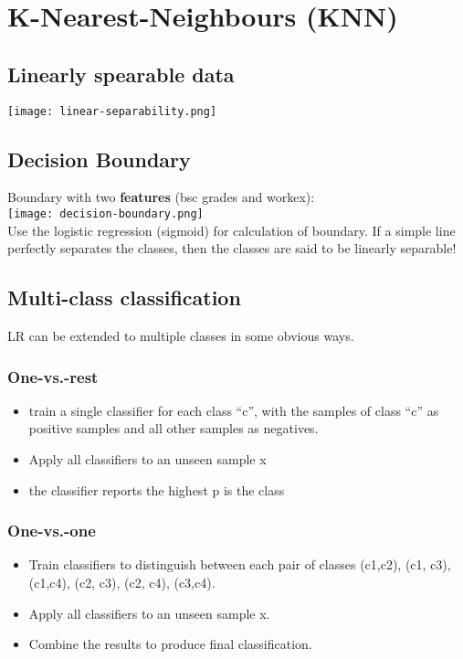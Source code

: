 \section{K-Nearest-Neighbours (KNN)}
\subsection{Linearly spearable data}
\texttt{[image: linear-separability.png]}

\subsection{Decision Boundary}
Boundary with two \textbf{features} (bsc grades and workex):\\
\texttt{[image: decision-boundary.png]}\\
Use the logistic regression (sigmoid) for calculation of boundary.
If a simple line perfectly separates the classes, then the classes are said to be linearly separable!

\subsection{Multi-class classification}
LR can be extended to multiple classes in some obvious ways.

\subsubsection{One-vs.-rest}
\begin{itemize}
  \item train a single classifier for each class ``c'', with the samples of class ``c'' as positive samples and all other samples as negatives.
  \item Apply all classifiers to an unseen sample x
  \item the classifier reports the highest p is the class
\end{itemize}

\subsubsection{One-vs.-one}
\begin{itemize}
  \item Train classifiers to distinguish between each pair of classes (c1,c2), (c1, c3), (c1,c4), (c2, c3), (c2, c4), (c3,c4).
  \item Apply all classifiers to an unseen sample x.
  \item Combine the results to produce final classification.
\end{itemize}


